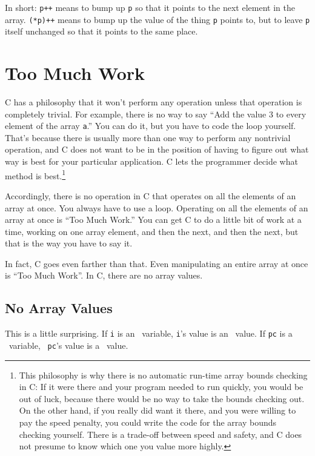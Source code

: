 \begin{itemize}
In short:  {\tt p++} means to bump up {\tt p} so that it points to the
next element in the array.  {\tt (*p)++} means to bump up the value of
the thing {\tt p} points to, but to leave {\tt p} itself unchanged so
that it points to the same place. 

\end{itemize}

\section{Too Much Work}

C has a philosophy that it won't perform any operation unless that
operation is completely trivial.  For example, there is no way to say
``Add the value 3 to every element of the array {\tt a}.''  You can do
it, but you have to code the loop yourself.  That's because there is
usually more than one way to perform any nontrivial operation, and C
does not want to be in the position of having to figure out what way is
best for your particular application.  C lets the programmer decide what
method is best.\footnote{This philosophy is why there is no automatic
run-time array bounds checking in C: If it were there and your program
needed to run quickly, you would be out of luck, because there would be
no way to take the bounds checking out.  On the other hand, if you
really did want it there, and you were willing to pay the speed penalty,
you could write the code for the array bounds checking yourself.  There
is a trade-off between speed and safety, and C does not presume to know
which one you value more highly.}  

Accordingly, there is no operation in C that operates on all the
elements of an array at once.  You always have to use a loop.  Operating
on all the elements of an array at once is ``Too Much Work.''  You can
get C to do a little bit of work at a time, working on one array
element, and then the next, and then the next, but that is the way you
have to say it.

In fact, C goes even farther than that.  Even manipulating an entire
array at once is ``Too Much Work''.   In C, there are no array values.  

\subsection{No Array Values}

This is a little surprising.  If {\tt i} is an \int\ variable, {\tt i}'s
value is an \int\ value.  If {\tt pc} is a \Char\ variable, {\tt
pc}'s value is a \Char\ value.  

